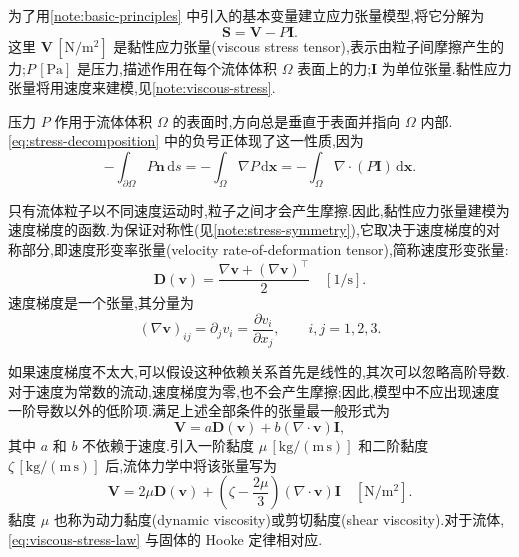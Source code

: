 \begin{note}[应力张量的分解]\label{note:stress-decomposition}
为了用\cref{note:basic-principles} 中引入的基本变量建立应力张量模型,将它分解为
\begin{equation}\label{eq:stress-decomposition}
  \bm{S}=\bm{V}-P\bm{I}.
\end{equation}
这里 $\bm{V}\,[\mathrm{N}/\mathrm{m}^2]$ 是黏性应力张量(viscous stress tensor),表示由粒子间摩擦产生的力;$P\,[\mathrm{Pa}]$ 是压力,描述作用在每个流体体积 $\Omega$ 表面上的力;$\bm{I}$ 为单位张量.黏性应力张量将用速度来建模,见\cref{note:viscous-stress}.
\end{note}

\begin{note}[压力]\label{note:pressure}
压力 $P$ 作用于流体体积 $\Omega$ 的表面时,方向总是垂直于表面并指向 $\Omega$ 内部.\cref{eq:stress-decomposition} 中的负号正体现了这一性质,因为
\begin{equation*}
  -\int_{\partial\Omega}P\bm{n}\,\mathrm{d}s
  =-\int_{\Omega}\nabla P\,\mathrm{d}\bm{x}
  =-\int_{\Omega}\nabla\cdot(P\bm{I})\,\mathrm{d}\bm{x}.
\end{equation*}
\end{note}

\begin{note}[黏性应力张量]\label{note:viscous-stress}
只有流体粒子以不同速度运动时,粒子之间才会产生摩擦.因此,黏性应力张量建模为速度梯度的函数.为保证对称性(见\cref{note:stress-symmetry}),它取决于速度梯度的对称部分,即速度形变率张量(velocity rate-of-deformation tensor),简称速度形变张量:
\begin{equation*}
  \bm{D}(\bm{v})
  =\frac{\nabla\bm{v}+(\nabla\bm{v})^{\top}}{2}
  \quad[1/\mathrm{s}].
\end{equation*}
速度梯度是一个张量,其分量为
\begin{equation*}
  (\nabla\bm{v})_{ij}=\partial_jv_i
  =\frac{\partial v_i}{\partial x_j},
  \qquad i,j=1,2,3.
\end{equation*}

如果速度梯度不太大,可以假设这种依赖关系首先是线性的,其次可以忽略高阶导数.对于速度为常数的流动,速度梯度为零,也不会产生摩擦;因此,模型中不应出现速度一阶导数以外的低阶项.满足上述全部条件的张量最一般形式为
\begin{equation*}
  \bm{V}=a\bm{D}(\bm{v})+b(\nabla\cdot\bm{v})\bm{I},
\end{equation*}
其中 $a$ 和 $b$ 不依赖于速度.引入一阶黏度 $\mu\,[\mathrm{kg}/(\mathrm{m}\,\mathrm{s})]$ 和二阶黏度 $\zeta\,[\mathrm{kg}/(\mathrm{m}\,\mathrm{s})]$ 后,流体力学中将该张量写为
\begin{equation}\label{eq:viscous-stress-law}
  \bm{V}=2\mu\bm{D}(\bm{v})
    +\left(\zeta-\frac{2\mu}{3}\right)
      (\nabla\cdot\bm{v})\bm{I}
  \quad[\mathrm{N}/\mathrm{m}^2].
\end{equation}
黏度 $\mu$ 也称为动力黏度(dynamic viscosity)或剪切黏度(shear viscosity).对于流体,\cref{eq:viscous-stress-law} 与固体的 Hooke 定律相对应.
\end{note}

